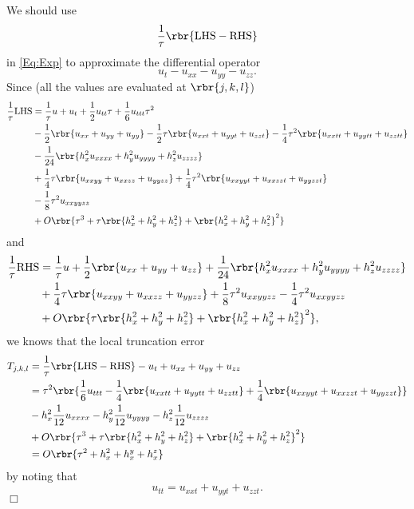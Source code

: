 \documentclass[english, nochinese]{pnote}
\begin{document}
We should use
\begin{equation}
\frac{1}{\tau} \rbr{ \text{LHS} - \text{RHS} }
\end{equation}
in \eqref{Eq:Exp} to approximate the differential operator
\begin{equation}
u_t - u_{ x x } - u_{ y y } - u_{ z z }.
\end{equation}
Since (all the values are evaluated at $ \rbr{ j, k, l } $)
\begin{equation}
\begin{split}
\frac{1}{\tau} \text{LHS} &= \frac{1}{\tau} u + u_t + \frac{1}{2} u_{ t t } \tau + \frac{1}{6} u_{ t t t } \tau^2 \\
&- \frac{1}{2} \rbr{ u_{ x x } + u_{ y y } + u_{ y y } } - \frac{1}{2} \tau \rbr{ u_{ x x t } + u_{ y y t } + u_{ z z t } } - \frac{1}{4} \tau^2 \rbr{ u_{ x x t t } + u_{ y y t t } + u_{ z z t t } } \\
&- \frac{1}{24} \rbr{ h_x^2 u_{ x x x x } + h_y^2 u_{ y y y y } + h_z^2 u_{ z z z z } } \\
&+ \frac{1}{4} \tau \rbr{ u_{ x x y y } + u_{ x x z z } + u_{ y y z z } } + \frac{1}{4} \tau^2 \rbr{ u_{ x x y y t } + u_{ x x z z t } + u_{ y y z z t } } \\
&- \frac{1}{8} \tau^2 u_{ x x y y z z } \\
&+ O \rbr{ \tau^3 + \tau \rbr{ h_x^2 + h_y^2 + h_z^2 } + \rbr{ h_x^2 + h_y^2 + h_z^2 }^2 }
\end{split}
\end{equation}
and
\begin{equation}
\begin{split}
\frac{1}{\tau} \text{RHS} &= \frac{1}{\tau} u + \frac{1}{2} \rbr{ u_{ x x } + u_{ y y } + u_{ z z } } + \frac{1}{24} \rbr{ h_x^2 u_{ x x x x } + h_y^2 u_{ y y y y } + h_z^2 u_{ z z z z } } \\
&+ \frac{1}{4} \tau \rbr{ u_{ x x y y } + u_{ x x z z } + u_{ y y z z } } + \frac{1}{8} \tau^2 u_{ x x y y z z } - \frac{1}{4} \tau^2 u_{ x x y y z z } \\
&+ O \rbr{ \tau \rbr{ h_x^2 + h_y^2 + h_z^2 } + \rbr{ h_x^2 + h_y^2 + h_z^2 }^2 },
\end{split}
\end{equation}
we knows that the local truncation error
\begin{equation}
\begin{split}
T_{ j, k, l } &= \frac{1}{\tau} \rbr{ \text{LHS} - \text{RHS} } - u_t + u_{ x x } + u_{ y y } + u_{ z z } \\
&= \tau^2 \rbr{ \frac{1}{6} u_{ t t t } - \frac{1}{4} \rbr{ u_{ x x t t } + u_{ y y t t } + u_{ z z t t } } + \frac{1}{4} \rbr{ u_{ x x y y t } + u_{ x x z z t } + u_{ y y z z t } } } \\
&- h_x^2 \frac{1}{12} u_{ x x x x } - h_y^2 \frac{1}{12} u_{ y y y y } - h_z^2 \frac{1}{12} u_{ z z z z } \\
&+ O \rbr{ \tau^3 + \tau \rbr{ h_x^2 + h_y^2 + h_z^2 } + \rbr{ h_x^2 + h_y^2 + h_z^2 }^2 } \\
&= O \rbr{ \tau^2 + h_x^2 + h_x^y + h_x^z }
\end{split}
\end{equation}
by noting that
\begin{equation}
u_{ t t } = u_{ x x t } + u_{ y y t } + u_{ z z t }.
\end{equation}
\hfill$\Box$
\end{document}
